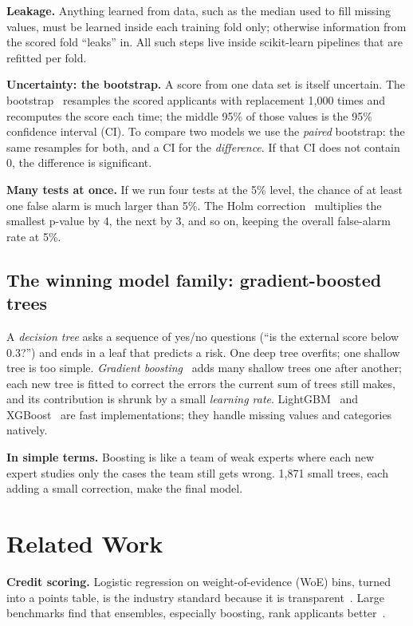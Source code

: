 \documentclass[conference,10pt]{IEEEtran}
\newcommand{\simple}[1]{\par\smallskip\noindent\colorbox{gray!13}{\parbox{\dimexpr\columnwidth-2\fboxsep\relax}{\small\textbf{In simple terms.} #1}}\par\smallskip}
\begin{document}
\textbf{Leakage.} Anything learned from data, such as the median used to fill missing values,
must be learned inside each training fold only; otherwise information from the scored fold
``leaks'' in. All such steps live inside scikit-learn pipelines that are refitted per fold.

\textbf{Uncertainty: the bootstrap.} A score from one data set is itself uncertain. The
bootstrap~\cite{efron1993} resamples the scored applicants with replacement 1,000 times and
recomputes the score each time; the middle 95\% of those values is the 95\% confidence interval
(CI). To compare two models we use the \emph{paired} bootstrap: the same resamples for both, and
a CI for the \emph{difference}. If that CI does not contain 0, the difference is significant.

\textbf{Many tests at once.} If we run four tests at the 5\% level, the chance of at least one
false alarm is much larger than 5\%. The Holm correction~\cite{holm1979} multiplies the smallest
p-value by 4, the next by 3, and so on, keeping the overall false-alarm rate at 5\%.

\subsection{The winning model family: gradient-boosted trees}
A \emph{decision tree} asks a sequence of yes/no questions (``is the external score below
0.3?'') and ends in a leaf that predicts a risk. One deep tree overfits; one shallow tree is too
simple. \emph{Gradient boosting}~\cite{friedman2001} adds many shallow trees one after another;
each new tree is fitted to correct the errors the current sum of trees still makes, and its
contribution is shrunk by a small \emph{learning rate}. LightGBM~\cite{ke2017} and
XGBoost~\cite{chen2016} are fast implementations; they handle missing values and categories
natively.

\simple{Boosting is like a team of weak experts where each new expert studies only the cases
the team still gets wrong. 1,871 small trees, each adding a small correction, make the final
model.}

\section{Related Work}
\textbf{Credit scoring.} Logistic regression on weight-of-evidence (WoE) bins, turned into a
points table, is the industry standard because it is transparent~\cite{thomas2002,siddiqi2006}.
Large benchmarks find that ensembles, especially boosting, rank applicants
better~\cite{lessmann2015}.
\end{document}
